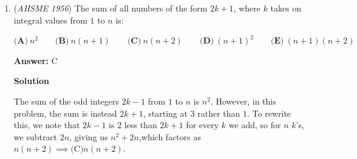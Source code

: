 \begin{enumerate}
\textbf{Solution}

Let $x = \angle CDE$ and let $\angle DAE = a$.

 First, consider the large isosceles triangle $\triangle ABC$, where $AB = AC$. The vertex angle is:
 \[\angle BAC = \angle BAD + \angle DAE = 30^\circ + a\]

 Since the sum of angles in $\triangle ABC$ is $180^\circ$ and the base angles $\angle ABC$ and $\angle BCA$ are equal:
 \[\angle BCA = \frac{180^\circ - (30^\circ + a)}{2} = 75^\circ - \frac{a}{2}\]

 Next, consider the smaller isosceles triangle $\triangle ADE$, where $AD = AE$. The vertex angle is $\angle DAE = a$. Since the base angles $\angle ADE$ and $\angle DEA$ are equal:
 \[\angle ADE = \angle DEA = \frac{180^\circ - a}{2} = 90^\circ - \frac{a}{2}\]

 Now, look at the angles along line segment $AC$ at vertex $E$, or by using the exterior angle theorem on $\triangle DEC$. The exterior angle $\angle DEA$ to $\triangle DEC$ is equal to the sum of its two opposite interior angles:
 \[\angle DEA = \angle CDE + \angle BCA\]

 Substituting the expressions we found for $\angle DEA$ and $\angle BCA$:
 \[90^\circ - \frac{a}{2} = x + \left(75^\circ - \frac{a}{2}\right)\]

 Subtracting $75^\circ - \frac{a}{2}$ from both sides gives:
 \[x = 90^\circ - 75^\circ = 15^\circ\]

 Thus, $\angle CDE = 15^\circ$, which corresponds to $\mathbf{(D)}$.

 


 


	\item (\textit{AHSME 1956}) The sum of all numbers of the form $2k + 1$, where $k$ takes on integral values from $1$ to $n$ is: 


 $\textbf{(A)}\ n^2\qquad\textbf{(B)}\ n(n+1)\qquad\textbf{(C)}\ n(n+2)\qquad\textbf{(D)}\ (n+1)^2\qquad\textbf{(E)}\ (n+1)(n+2)$

 \textbf{Answer: }C



\textbf{Solution}

The sum of the odd integers $2k-1$ from $1$ to $n$ is $n^2$. However, in this problem, the sum is instead $2k+1$, starting at $3$ rather than $1$. To rewrite this, we note that $2k-1$ is $2$ less than $2k+1$ for every $k$ we add, so for $n$ $k$'s, we subtract $2n$, giving us $n^2+2n$,which factors as $n(n+2) \implies \boxed{\text{(C)} n(n+2)}$.


\end{enumerate}
